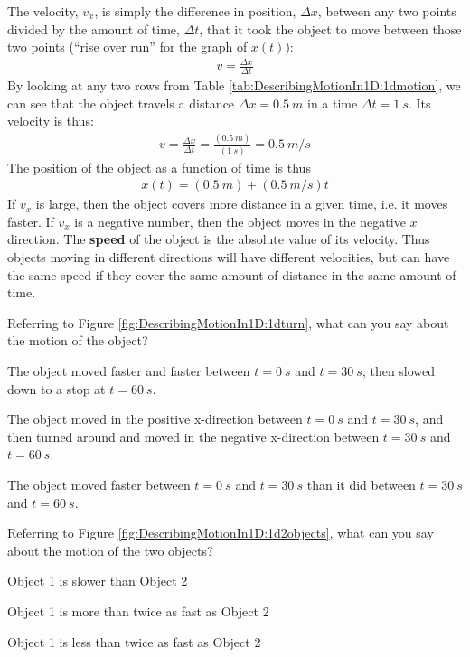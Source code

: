 The velocity, $v_x$, is simply the difference in position, $\Delta x$, between any two points divided by the amount of time, $\Delta t$, that it took the object to move between those two points (``rise over run'' for the graph of $x(t)$):
\begin{align*}
v = \frac{\Delta x}{\Delta t}
\end{align*}
By looking at any two rows from Table \ref{tab:DescribingMotionIn1D:1dmotion}, we can see that the object travels a distance $\Delta x=\SI{0.5}{m}$ in a time $\Delta t=\SI{1}{s}$. Its velocity is thus:
\begin{align*}
v = \frac{\Delta x}{\Delta t} = \frac{(\SI{0.5}{m})}{(\SI{1}{s})}=\SI{0.5}{m/s}
\end{align*}
The position of the object as a function of time is thus
\begin{align*}
x(t) = (\SI{0.5}{m}) + (\SI{0.5}{m/s}) t
\end{align*}
If $v_x$ is large, then the object covers more distance in a given time, i.e. it moves faster. If $v_x$ is a negative number, then the object moves in the negative $x$ direction. The \textbf{speed} of the object is the absolute value of its velocity. Thus objects moving in different directions will have different velocities, but can have the same speed if they cover the same amount of distance in the same amount of time.
\newpage
\begin{checkpoint}
\begin{MCquestion}{Referring to Figure \ref{fig:DescribingMotionIn1D:1dturn}, what can you say about the motion of the object? }
\item The object moved faster and faster between $t=\SI{0}{s}$ and $t=\SI{30}{s}$, then slowed down to a stop at $t=\SI{60}{s}$.
\item The object moved in the positive x-direction between $t=\SI{0}{s}$ and $t=\SI{30}{s}$, and then turned around and moved in the negative x-direction between $t=\SI{30}{s}$ and $t=\SI{60}{s}$. \correct
\item The object moved faster between $t=\SI{0}{s}$ and $t=\SI{30}{s}$ than it did between $t=\SI{30}{s}$ and $t=\SI{60}{s}$.
\end{MCquestion}
\end{checkpoint}

\begin{checkpoint}
\begin{MCquestion}{Referring to Figure \ref{fig:DescribingMotionIn1D:1d2objects}, what can you say about the motion of the two objects? }
\item Object 1 is slower than Object 2
\item Object 1 is more than twice as fast as Object 2 \correct
\item Object 1 is less than twice as fast as Object 2
\end{MCquestion}
\end{checkpoint}

